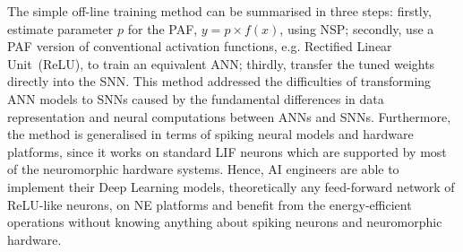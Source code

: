 
The simple off-line training method can be summarised in three steps:
firstly, estimate parameter $p$ for the PAF, $y = p \times f(x)$, using NSP;
secondly, use a PAF version of conventional activation functions, e.g. Rectified Linear Unit~(ReLU), to train an equivalent ANN;
thirdly, transfer the tuned weights directly into the SNN.
This method addressed the difficulties of transforming ANN models to SNNs caused by the fundamental differences in data representation and neural computations between ANNs and SNNs.
Furthermore, the method is generalised in terms of spiking neural models and hardware platforms, since it works on standard LIF neurons which are supported by most of the neuromorphic hardware systems.
Hence, AI engineers are able to implement their Deep Learning models, theoretically any feed-forward network of ReLU-like neurons, on NE platforms and benefit from the energy-efficient operations without knowing anything about spiking neurons and neuromorphic hardware.  




